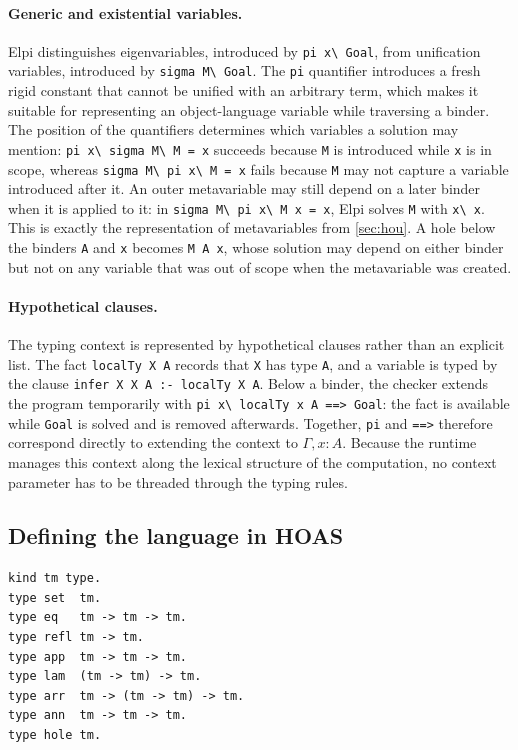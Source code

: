 \paragraph{Generic and existential variables.}
Elpi distinguishes eigenvariables, introduced by \lstinline|pi x\ Goal|, from
unification variables, introduced by \lstinline|sigma M\ Goal|. The
\lstinline|pi| quantifier introduces a fresh rigid constant that cannot be
unified with an arbitrary term, which makes it suitable for representing an
object-language variable while traversing a binder. The position of the
quantifiers determines which variables a solution may mention:
\lstinline|pi x\ sigma M\ M = x| succeeds because \lstinline|M| is introduced
while \lstinline|x| is in scope, whereas \lstinline|sigma M\ pi x\ M = x| fails
because \lstinline|M| may not capture a variable introduced after it. An outer
metavariable may still depend on a later binder when it is applied to it: in
\lstinline|sigma M\ pi x\ M x = x|, Elpi solves \lstinline|M| with
\lstinline|x\ x|. This is exactly the representation of metavariables from
\cref{sec:hou}. A hole below the binders \lstinline|A| and \lstinline|x| becomes
\lstinline|M A x|, whose solution may depend on either binder but not on any
variable that was out of scope when the metavariable was created.

\paragraph{Hypothetical clauses.}
The typing context is represented by hypothetical clauses rather than an
explicit list. The fact \lstinline|localTy X A| records that \lstinline|X| has
type \lstinline|A|, and a variable is typed by the clause
\lstinline|infer X X A :- localTy X A|. Below a binder, the checker extends the
program temporarily with \lstinline|pi x\ localTy x A ==> Goal|: the fact is
available while \lstinline|Goal| is solved and is removed afterwards. Together,
\lstinline|pi| and \lstinline|==>| therefore correspond directly to extending the
context to $\Gamma, x : A$. Because the runtime manages this context along the
lexical structure of the computation, no context parameter has to be threaded
through the typing rules.

\subsection{Defining the language in HOAS}

\begin{lstlisting}[language=Elpi, caption={The syntax of the language written in Elpi},
label={lst:elpi-syntax}]
kind tm type.
type set  tm.
type eq   tm -> tm -> tm.
type refl tm -> tm.
type app  tm -> tm -> tm.
type lam  (tm -> tm) -> tm.
type arr  tm -> (tm -> tm) -> tm.
type ann  tm -> tm -> tm.
type hole tm.
\end{lstlisting}

